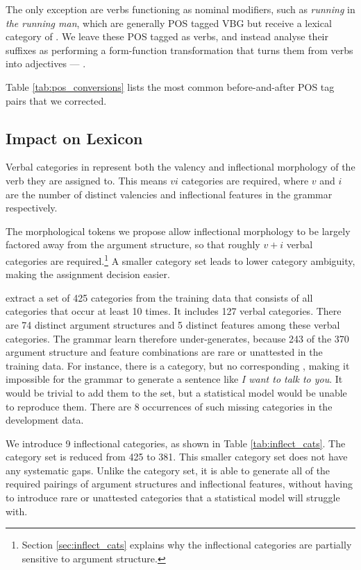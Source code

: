 \documentclass[11pt]{article}
\begin{document}
The only exception are verbs
functioning as nominal modifiers, such as \emph{running} in
\emph{the running man}, which are generally POS tagged VBG but receive a
lexical category of . We leave these POS tagged as verbs, and instead
analyse their suffixes as performing a form-function transformation that turns
them from  verbs into  adjectives ---
.

Table \ref{tab:pos_conversions} lists the most common before-and-after POS tag
pairs that we corrected.
\pagebreak




\subsection{Impact on \ccgbank Lexicon}

Verbal categories in \ccgbank \citep{hock:cl07} represent both the valency and
inflectional morphology of the verb they are assigned to. This means $vi$
categories are required, where $v$ and $i$ are the number of distinct valencies
and inflectional features in the grammar respectively.

The morphological tokens we propose allow inflectional morphology to be
largely factored away from the argument structure, so that roughly $v+i$ verbal
categories are required.\footnote{Section \ref{sec:inflect_cats} explains why
the inflectional categories are partially sensitive to argument structure.}
A smaller category set leads to lower
category ambiguity, making the assignment decision easier.

\citet{clark:cl07} extract a set of 425 categories from the training data that
consists of all categories that occur at least 10 times.
It includes 127 verbal categories.
There are 74 distinct argument structures and 5 distinct features among these verbal categories.
The grammar \citet{clark:cl07} learn therefore under-generates, because 243 of the 370
argument structure and feature combinations are rare or unattested in the training data.
For instance, there is a  category, but no corresponding ,
making it impossible for the grammar to generate a sentence like \emph{I want to talk to you}.
It would be trivial to add them to the set, but a statistical model would be unable to reproduce them.
There are 8 occurrences of such missing categories in the development data.

We introduce 9 inflectional categories, as shown in Table \ref{tab:inflect_cats}.
The category set is reduced from 425 to 381. This smaller category
set does not have any systematic gaps. Unlike the \citet{clark:cl07} category
set, it is able to generate all of the required pairings of argument structures
and inflectional features, without having to introduce rare or unattested
categories that a statistical model will struggle with.
\pagebreak
\end{document}
